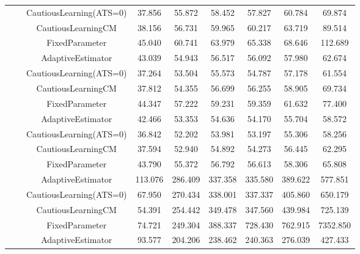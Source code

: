 \begin{table}[!h]
\begin{tabular}[t]{ccccccccc}
 &  & CautiousLearning(ATS=0) & 37.856 & 55.872 & 58.452 & 57.827 & 60.784 & 69.874\\

 &  & CautiousLearningCM & 38.156 & 56.731 & 59.965 & 60.217 & 63.719 & 89.514\\

 & \multirow[t]{-4}{*}{\centering\arraybackslash 1.00} & FixedParameter & 45.040 & 60.741 & 63.979 & 65.338 & 68.646 & 112.689\\
\cmidrule{2-9}
 &  & AdaptiveEstimator & 43.039 & 54.943 & 56.517 & 56.092 & 57.980 & 62.674\\

 &  & CautiousLearning(ATS=0) & 37.264 & 53.504 & 55.573 & 54.787 & 57.178 & 61.554\\

 &  & CautiousLearningCM & 37.812 & 54.355 & 56.699 & 56.255 & 58.905 & 69.734\\

 & \multirow[t]{-4}{*}{\centering\arraybackslash 1.25} & FixedParameter & 44.347 & 57.222 & 59.231 & 59.359 & 61.632 & 77.400\\
\cmidrule{2-9}
 &  & AdaptiveEstimator & 42.466 & 53.353 & 54.636 & 54.170 & 55.704 & 58.572\\

 &  & CautiousLearning(ATS=0) & 36.842 & 52.202 & 53.981 & 53.197 & 55.306 & 58.256\\

 &  & CautiousLearningCM & 37.594 & 52.940 & 54.892 & 54.273 & 56.445 & 62.295\\

\multirow[t]{-28}{*}{\centering\arraybackslash 50} & \multirow[t]{-4}{*}{\centering\arraybackslash 1.50} & FixedParameter & 43.790 & 55.372 & 56.792 & 56.613 & 58.306 & 65.808\\
\cmidrule{1-9}
 &  & AdaptiveEstimator & 113.076 & 286.409 & 337.358 & 335.580 & 389.622 & 577.851\\

 &  & CautiousLearning(ATS=0) & 67.950 & 270.434 & 338.001 & 337.337 & 405.860 & 650.179\\

 &  & CautiousLearningCM & 54.391 & 254.442 & 349.478 & 347.560 & 439.984 & 725.139\\

 & \multirow[t]{-4}{*}{\centering\arraybackslash 0.25} & FixedParameter & 74.721 & 249.304 & 388.337 & 728.430 & 762.915 & 7352.850\\
\cmidrule{2-9}
 &  & AdaptiveEstimator & 93.577 & 204.206 & 238.462 & 240.363 & 276.039 & 427.433\\


\end{tabular}
\end{table}

